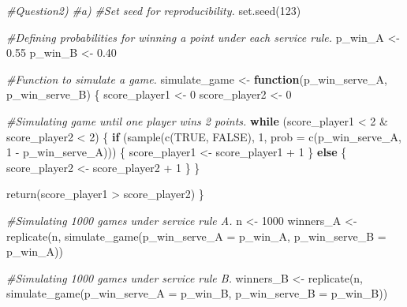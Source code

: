 \documentclass[
]{article}
\newenvironment{Shaded}{\begin{snugshade}}{\end{snugshade}}
\newcommand{\AttributeTok}[1]{\textcolor[rgb]{0.77,0.63,0.00}{#1}}
\newcommand{\CommentTok}[1]{\textcolor[rgb]{0.56,0.35,0.01}{\textit{#1}}}
\newcommand{\ConstantTok}[1]{\textcolor[rgb]{0.00,0.00,0.00}{#1}}
\newcommand{\ControlFlowTok}[1]{\textcolor[rgb]{0.13,0.29,0.53}{\textbf{#1}}}
\newcommand{\DecValTok}[1]{\textcolor[rgb]{0.00,0.00,0.81}{#1}}
\newcommand{\FloatTok}[1]{\textcolor[rgb]{0.00,0.00,0.81}{#1}}
\newcommand{\FunctionTok}[1]{\textcolor[rgb]{0.00,0.00,0.00}{#1}}
\newcommand{\NormalTok}[1]{#1}
\newcommand{\OtherTok}[1]{\textcolor[rgb]{0.56,0.35,0.01}{#1}}
\newcommand{\SpecialCharTok}[1]{\textcolor[rgb]{0.00,0.00,0.00}{#1}}
\begin{document}
\begin{Shaded}
\begin{Highlighting}[]
\CommentTok{\#Question2)}
\CommentTok{\#a)}
\CommentTok{\#Set seed for reproducibility.}
\FunctionTok{set.seed}\NormalTok{(}\DecValTok{123}\NormalTok{)}

\CommentTok{\#Defining probabilities for winning a point under each service rule.}
\NormalTok{p\_win\_A }\OtherTok{\textless{}{-}} \FloatTok{0.55}
\NormalTok{p\_win\_B }\OtherTok{\textless{}{-}} \FloatTok{0.40}

\CommentTok{\#Function to simulate a game.}
\NormalTok{simulate\_game }\OtherTok{\textless{}{-}} \ControlFlowTok{function}\NormalTok{(p\_win\_serve\_A, p\_win\_serve\_B) \{}
\NormalTok{  score\_player1 }\OtherTok{\textless{}{-}} \DecValTok{0}
\NormalTok{  score\_player2 }\OtherTok{\textless{}{-}} \DecValTok{0}
  
  \CommentTok{\#Simulating game until one player wins 2 points.}
  \ControlFlowTok{while}\NormalTok{ (score\_player1 }\SpecialCharTok{\textless{}} \DecValTok{2} \SpecialCharTok{\&}\NormalTok{ score\_player2 }\SpecialCharTok{\textless{}} \DecValTok{2}\NormalTok{) \{}
    \ControlFlowTok{if}\NormalTok{ (}\FunctionTok{sample}\NormalTok{(}\FunctionTok{c}\NormalTok{(}\ConstantTok{TRUE}\NormalTok{, }\ConstantTok{FALSE}\NormalTok{), }\DecValTok{1}\NormalTok{, }\AttributeTok{prob =} \FunctionTok{c}\NormalTok{(p\_win\_serve\_A, }\DecValTok{1} \SpecialCharTok{{-}}\NormalTok{ p\_win\_serve\_A))) \{}
\NormalTok{      score\_player1 }\OtherTok{\textless{}{-}}\NormalTok{ score\_player1 }\SpecialCharTok{+} \DecValTok{1}
\NormalTok{    \} }\ControlFlowTok{else}\NormalTok{ \{}
\NormalTok{      score\_player2 }\OtherTok{\textless{}{-}}\NormalTok{ score\_player2 }\SpecialCharTok{+} \DecValTok{1}
\NormalTok{    \}}
\NormalTok{  \}}
  
  \FunctionTok{return}\NormalTok{(score\_player1 }\SpecialCharTok{\textgreater{}}\NormalTok{ score\_player2)}
\NormalTok{\}}

\CommentTok{\#Simulating 1000 games under service rule A.}
\NormalTok{n }\OtherTok{\textless{}{-}} \DecValTok{1000}
\NormalTok{winners\_A }\OtherTok{\textless{}{-}} \FunctionTok{replicate}\NormalTok{(n, }\FunctionTok{simulate\_game}\NormalTok{(}\AttributeTok{p\_win\_serve\_A =}\NormalTok{ p\_win\_A, }\AttributeTok{p\_win\_serve\_B =}\NormalTok{ p\_win\_A))}

\CommentTok{\#Simulating 1000 games under service rule B.}
\NormalTok{winners\_B }\OtherTok{\textless{}{-}} \FunctionTok{replicate}\NormalTok{(n, }\FunctionTok{simulate\_game}\NormalTok{(}\AttributeTok{p\_win\_serve\_A =}\NormalTok{ p\_win\_B, }\AttributeTok{p\_win\_serve\_B =}\NormalTok{ p\_win\_B))}


\end{Highlighting}
\end{Shaded}
\end{document}
